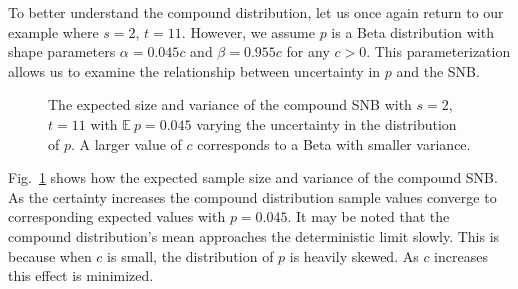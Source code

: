 \documentclass[review]{elsarticle}
\begin{document}
To better understand the compound distribution, let us once again return to 
our example where $s=2$, $t=11$. However, we assume $p$ is a Beta distribution
with shape parameters $\alpha = 0.045 c$ and 
$\beta = 0.955 c$ for any $c > 0$.
This parameterization allows us to examine the relationship between 
uncertainty in $p$ and the SNB.

\begin{figure}[h!]
\centering
{}
\hfill
{}
\caption{
The expected size and variance of the compound SNB with $s=2$, $t=11$
with $\mathbb{E}\ p = 0.045$ varying the uncertainty 
in the distribution of $p$. A larger value of $c$
corresponds to a Beta with smaller variance.
}
\label{fig:bayesian-sample-size}
\end{figure}

Fig.~\ref{fig:bayesian-sample-size} shows how the expected sample size
and variance of the compound SNB. As the certainty increases the 
compound distribution sample values converge to corresponding expected 
values with 
$p = 0.045$. It may be noted that the compound distribution's mean
approaches the deterministic limit slowly. This
is because when $c$ is small, the distribution of $p$ is heavily skewed. 
As $c$ increases this effect is minimized.
\end{document}
